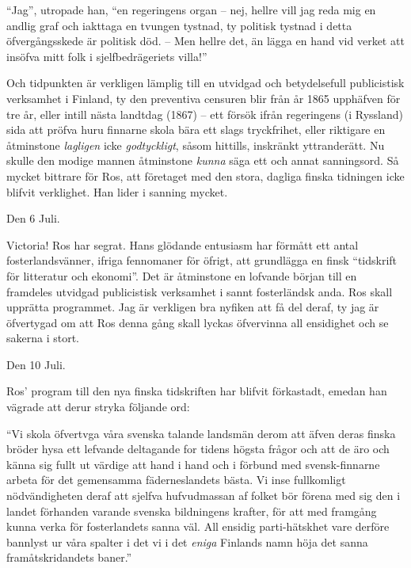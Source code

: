 ``Jag'', utropade han, ``en regeringens organ -- nej, hellre vill jag
reda mig en andlig graf och iakttaga en tvungen tystnad, ty politisk
tystnad i detta öfvergångsskede är politisk död. -- Men hellre det, än
lägga en hand vid verket att insöfva mitt folk i sjelfbedrägeriets
villa!''

Och tidpunkten är verkligen lämplig till en utvidgad och betydelsefull
publicistisk verksamhet i Finland, ty den preventiva censuren blir från
år 1865 upphäfven för tre år, eller intill nästa landtdag (1867) -- ett
försök ifrån regeringens (i Ryssland) sida att pröfva huru finnarne
skola bära ett slags tryckfrihet, eller riktigare en åtminstone
\emph{lagligen} icke \emph{godtyckligt}, såsom hittills, inskränkt
yttranderätt. Nu skulle den modige mannen åtminstone \emph{kunna} säga
ett och annat sanningsord. Så mycket bittrare för Ros, att företaget med
den stora, dagliga finska tidningen icke blifvit verklighet. Han lider i
sanning mycket.

Den 6 Juli.

Victoria! Ros har segrat. Hans glödande entusiasm har förmått ett antal
fosterlandsvänner, ifriga fennomaner för öfrigt, att grundlägga en finsk
``tidskrift för litteratur och ekonomi''. Det är åtminstone en lofvande
början till en framdeles utvidgad publicistisk verksamhet i sannt
fosterländsk anda. Ros skall upprätta programmet. Jag är verkligen bra
nyfiken att få del deraf, ty jag är öfvertygad om att Ros denna gång
skall lyckas öfvervinna all ensidighet och se sakerna i stort.

Den 10 Juli.

Ros' program till den nya finska tidskriften har blifvit förkastadt,
emedan han vägrade att derur stryka följande ord:

``Vi skola öfvertvga våra svenska talande landsmän derom att äfven deras
finska bröder hysa ett lefvande deltagande for tidens högsta frågor och
att de äro och känna sig fullt ut värdige att hand i hand och i förbund
med svensk-finnarne arbeta för det gemensamma fäderneslandets bästa. Vi
inse fullkomligt nödvändigheten deraf att sjelfva hufvudmassan af folket
bör förena med sig den i landet förhanden varande svenska bildningens
krafter, för att med framgång kunna verka för fosterlandets sanna väl.
All ensidig parti-hätskhet vare derföre bannlyst ur våra spalter i det
vi i det \emph{eniga} Finlands namn höja det sanna framåtskridandets
baner.''

